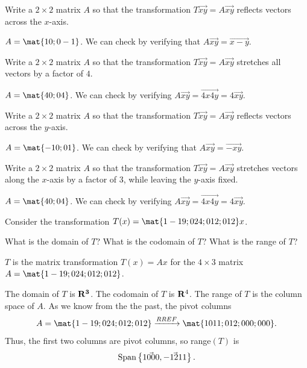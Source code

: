 \begin{problems}
\problem Write a $2 \times 2$ matrix $A$ so that the transformation
$T\vec{x y} = A\vec{x y}$ reflects vectors across the $x$-axis.

\begin{solution}
$A = \mat{1 0; 0 -1}$.  We can check by verifying that 
$A \vec{x y} = \vec{x -y}$.    
\end{solution}


\problem Write a $2 \times 2$ matrix $A$ so that the transformation
$T\vec{x y} = A\vec{x y}$ stretches all vectors by a factor of $4$.

\begin{solution}
$A = \mat{4 0; 0 4}$.  We can check by verifying 
$A \vec{x y} = \vec{4x 4y} = 4 \vec{x y}$.
\end{solution}

\problem Write a $2 \times 2$ matrix $A$ so that the transformation
$T\vec{x y} = A\vec{x y}$ reflects vectors across the $y$-axis.

\begin{solution}
$A = \mat{-1 0; 0 1}$.  We can check by verifying that
$A \vec{x y} = \vec{-x y}$.
\end{solution}

\problem Write a $2 \times 2$ matrix $A$ so that the transformation
$T\vec{x y} = A\vec{x y}$ stretches vectors along the $x$-axis by a factor of
$3$, while leaving the $y$-axis fixed.%

\begin{solution}
$A = \mat{4 0; 0 4}$.  We can check by verifying 
$A \vec{x y} = \vec{4x 4y} = 4 \vec{x y}$.
\end{solution}


\problem Consider the transformation
$T(x) = \mat{1 -1 9; 0 2 4; 0 1 2; 0 1 2} x$.
\begin{subproblems}
  \subproblem What is the domain of $T$?
  \subproblem What is the codomain of $T$?
  \subproblem What is the range of $T$?
\end{subproblems}

\begin{solution} $T$ is the matrix transformation $T(x) = Ax$ for the
  $4 \times 3$ matrix $A = \mat{1 -1 9; 0 2 4; 0 1 2; 0 1 2}$.
  \begin{subproblems}
    \subproblem The domain of $T$ is ${\bf R^3}$.  %
    \subproblem The codomain of $T$ is ${\bf R}^4$. %
    \subproblem The range of $T$ is the column space of $A$.  As we
    know from the the past, the pivot columns
    \[A = \mat{1 -1 9; 0 2 4; 0 1 2; 0 1 2} \xrightarrow[]{RREF}
      \mat{1 0 11; 0 1 2; 0 0 0; 0 0 0}.\] Thus, the first two columns
    are pivot columns, so range$(T)$ is
    \[\textup{Span}\left\{\vec{1 0 0 0}, \vec{-1 2 1 1}\right\}.\]
  \end{subproblems}
\end{solution}



\end{problems}
